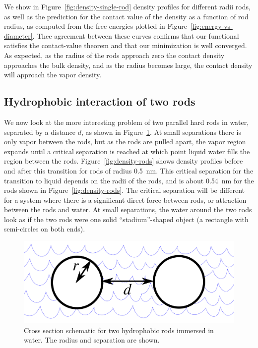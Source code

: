\documentclass[letterpaper,twocolumn,amsmath,amssymb,prb]{revtex4-1}
\begin{document}
We show in Figure~\ref{fig:density-single-rod} density profiles for
different radii rods, as well as the prediction for the contact value
of the density as a function of rod radius, as computed from the free
energies plotted in Figure~\ref{fig:energy-vs-diameter}.  Thee
agreement between these curves confirms that our functional satisfies
the contact-value theorem and that our minimization is well converged.
As expected, as the radius of the rods approach zero the
contact density approaches the bulk density, and as the radius becomes
large, the contact density will approach the vapor density.

\subsection{Hydrophobic interaction of two rods}

We now look at the more interesting problem of two parallel hard rods
in water, separated by a distance $d$, as shown in
Figure~\ref{fig:rods}.  At small separations there is only vapor
between the rods, but as the rods are pulled apart, the vapor region
expands until a critical separation is reached at which point liquid
water fills the region between the rods.
Figure~\ref{fig:density-rods} shows density profiles before and after
this transition for rods of radius 0.5~nm. This critical separation
for the transition to liquid depends on the radii of the rods, and is
about 0.54~nm for the rods shown in Figure~\ref{fig:density-rods}.
The critical separation will be different for a system where there is
a significant direct force between rods, or attraction between the
rods and water.  At small separations, the water around the two
rods look as if the two rods were one solid ``stadium''-shaped object
(a rectangle with semi-circles on both ends).

\begin{figure}
\begin{center}
\includegraphics[width=\columnwidth]{figs/rods-diagram}
\end{center}
\caption{ Cross section schematic for two hydrophobic rods immersed in water.
The radius and separation are shown.}
\label{fig:rods}
\end{figure}
\end{document}
